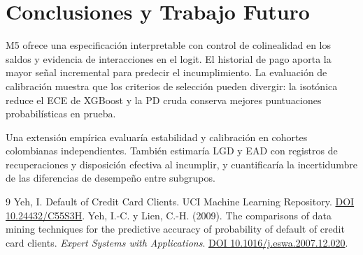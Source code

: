 \documentclass[11pt, a4paper]{article}
\begin{document}
\clearpage
\section{Conclusiones y Trabajo Futuro}
M5 ofrece una especificación interpretable con control de colinealidad en los saldos y evidencia de interacciones en el logit. El historial de pago aporta la mayor señal incremental para predecir el incumplimiento. La evaluación de calibración muestra que los criterios de selección pueden divergir: la isotónica reduce el ECE de XGBoost y la PD cruda conserva mejores puntuaciones probabilísticas en prueba.

Una extensión empírica evaluaría estabilidad y calibración en cohortes colombianas independientes. También estimaría LGD y EAD con registros de recuperaciones y disposición efectiva al incumplir, y cuantificaría la incertidumbre de las diferencias de desempeño entre subgrupos.

\begin{thebibliography}{9}
 Yeh, I. Default of Credit Card Clients. UCI Machine Learning Repository. \href{https://doi.org/10.24432/C55S3H}{DOI 10.24432/C55S3H}.
 Yeh, I.-C. y Lien, C.-H. (2009). The comparisons of data mining techniques for the predictive accuracy of probability of default of credit card clients. \emph{Expert Systems with Applications}. \href{https://doi.org/10.1016/j.eswa.2007.12.020}{DOI 10.1016/j.eswa.2007.12.020}.
\end{thebibliography}
\end{document}
